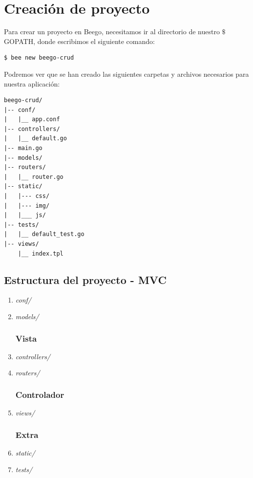 \documentclass[12pt]{article}
\begin{document}
\section{Creación de proyecto}\label{sec:proy}
\noindent Para crear un proyecto en Beego, necesitamos ir al directorio de nuestro $\$$GOPATH, donde escribimos el siguiente comando:
\begin{verbatim}
$ bee new beego-crud
\end{verbatim}
\noindent Podremos ver que se han creado las siguientes carpetas y archivos necesarios para nuestra aplicación:

\begin{verbatim}
beego-crud/
|-- conf/
|   |__ app.conf
|-- controllers/
|   |__ default.go
|-- main.go
|-- models/
|-- routers/
|   |__ router.go
|-- static/
|   |--- css/
|   |--- img/
|   |___ js/
|-- tests/
|   |__ default_test.go
|-- views/
    |__ index.tpl
\end{verbatim}

\subsection{Estructura del proyecto - MVC}
\begin{enumerate}[1)]
  \subsubsection*{Modelo}
\item \textit{conf/}
\item \textit{models/}
  \subsubsection*{Vista}
\item \textit{controllers/}
\item \textit{routers/}
  \subsubsection*{Controlador}
\item \textit{views/}
  \subsubsection*{Extra}
\item \textit{static/}
\item \textit{tests/}

\end{enumerate}
\end{document}
